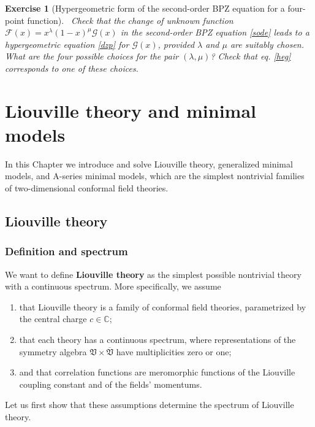 \documentclass[12pt, a4paper, notitlepage, twoside]{report}
\numberwithin{equation}{section}
\theoremstyle{break}
\newtheorem{exo}{Exercise}[chapter]
\begin{document}
\begin{exo}[Hypergeometric form of the second-order BPZ equation for a four-point function]
 ~\label{exohge}
 Check that the change of unknown function $\mathcal{F}(x)=x^{\lambda}(1-x)^{\mu}\mathcal{G}(x)$ in the second-order BPZ equation \eqref{sode} leads to a hypergeometric equation \eqref{dzp} for $\mathcal{G}(x)$, provided $\lambda$ and $\mu$ are suitably chosen.
What are the four possible choices for the pair $(\lambda,\mu)$?
Check that eq. \eqref{heg} corresponds to one of these choices.
\end{exo}



\cleardoublepage

\chapter{Liouville theory and minimal models \label{seccbm}}

In this Chapter we introduce and solve Liouville theory, generalized minimal models, and A-series minimal models, which are the simplest nontrivial families of two-dimensional conformal field theories. 

\section{Liouville theory \label{secliou}}

\subsection{Definition and spectrum \label{secspe}}

We want to define \textbf{Liouville theory} as the simplest possible nontrivial theory with a continuous spectrum. More specifically, we assume
\begin{enumerate}
 \item that Liouville theory is a family of conformal field theories, parametrized by the central charge $c\in\mathbb{C}$;
\item that each theory has a continuous spectrum, where representations of the symmetry algebra $\mathfrak{V}\times\overline{\mathfrak{V}}$ have multiplicities zero or one;
\item and that correlation functions are meromorphic functions of the Liouville coupling constant and of the fields' momentums.
\end{enumerate}
Let us first show that these assumptions determine the spectrum of Liouville theory.
\end{document}
